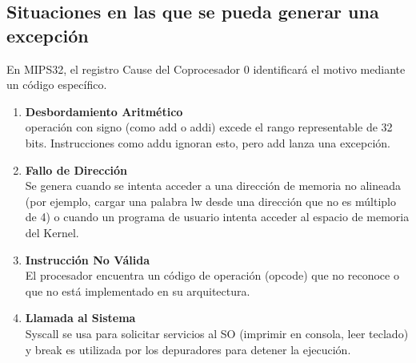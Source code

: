 \documentclass[]{article}
\begin{document}
	\subsection{Situaciones en las que se pueda generar una excepción}
		En MIPS32, el registro Cause del Coprocesador 0 identificará el motivo mediante un código específico.
		\begin{enumerate}
			\item \textbf{Desbordamiento Aritmético}\\
				operación con signo (como add o addi) excede el rango representable de 32 bits. Instrucciones como addu ignoran esto, pero add lanza una excepción.
			\item \textbf{Fallo de Dirección}\\
				Se genera cuando se intenta acceder a una dirección de memoria no alineada (por ejemplo, cargar una palabra lw desde una dirección que no es múltiplo de 4) o cuando un programa de usuario intenta acceder al espacio de memoria del Kernel.
			\item \textbf{Instrucción No Válida}\\
				El procesador encuentra un código de operación (opcode) que no reconoce o que no está implementado en su arquitectura.
			\item \textbf{Llamada al Sistema} \\    
				Syscall se usa para solicitar servicios al SO (imprimir en consola, leer teclado) y break es utilizada por los depuradores para detener la ejecución.
		\end{enumerate}
\end{document}
